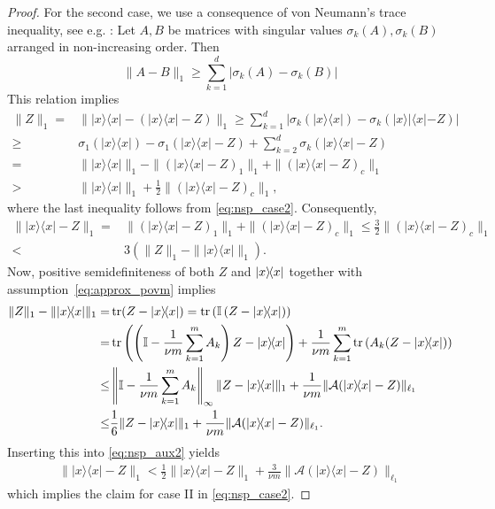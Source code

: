 \begin{proof}
For the second case, we use a consequence of von Neumann's trace inequality, see e.g. \cite[Theorem~7.4.9.1]{Horn_1994_Topics}: Let $A, B$ be matrices with singular values $\sigma_k (A),\sigma_k (B)$ arranged in non-increasing order.
Then
\begin{equation*}
  \| A - B \|_1 \geq \sum_{k=1}^d | \sigma_k (A) - \sigma_k (B)|
\end{equation*}
This relation implies
\begin{align*}
  \| Z \|_1 =& \| |{x} \rangle \! \langle {x}| - (|{x} \rangle \! \langle {x}|-Z) \|_1
  \geq \sum_{k=1}^d \left| \sigma_k (| x \rangle \! \langle  x|) - \sigma_k (| x \rangle \! |\langle  x|- Z ) \right| \\
  \geq & \sigma_1 (| x \rangle \langle  x|) - \sigma_1 \left( | x \rangle \! \langle  x| - Z \right)+ \sum_{k=2}^d \sigma_k \left( | x \rangle \! \langle  x| - Z\right) \\
  =&  \| | x \rangle \! \langle  x| \|_1  - \| (| x \rangle \! \langle  x| - Z)_1 \|_1 + \|(| x \rangle \! \langle  x| -Z)_c \|_1 \\
  >& \| | x \rangle \! \langle  x| \|_1 + \frac{1}{2} \| (| x \rangle \! \langle  x|-Z)_c \|_1,
\end{align*}
where the last inequality follows from \eqref{eq:nsp_case2}. Consequently,
\begin{align}
  \| | x \rangle \! \langle  x| - Z \|_1
  =& \| (| x \rangle \! \langle  x| - Z)_1 \|_1 + \| (| x \rangle \! \langle  x|-Z)_c \|_1
  \leq \frac{3}{2} \| (| x \rangle \! \langle  x|- Z )_c \|_1 \nonumber \\
  < & 3 \left( \| Z \|_1 - \| | x \rangle \! \langle  x| \|_1 \right). \label{eq:nsp_aux2}
\end{align}
Now, positive semidefiniteness of both $Z$ and $\ket{ x}\bra{ x}$ together with assumption~\eqref{eq:approx_povm} implies
\begin{align*}
  \| Z \|_1 - \| |{x} \rangle \! \langle {x}| \|_1
  =& \tr (Z-|{x} \rangle \! \langle {x}|) =  \tr \left( \mathbb{I} \left( Z-| {x} \rangle \! \langle x|\right) \right) \\
  =&  \tr \left( \left( \mathbb{I} - \frac{1}{\nu m} \sum_{k=1}^m A_k \right) Z-|{x} \rangle \! \langle {x}| \right) + \frac{1}{\nu m} \sum_{k=1}^m \tr \left( A_k (Z-|{x} \rangle \! \langle {x}|) \right) \\
  \leq &  \left\|\mathbb{I}- \frac{1}{ \nu m} \sum_{k=1}^m A_k \right\|_\infty \| Z-|{x} \rangle \! \langle {x}| \|_1 + \frac{1}{\nu m} \| \mathcal{A}(|{x} \rangle \! \langle {x}|-Z) \|_{\ell_1} \\
  \leq &  \frac{1}{6 } \| Z-|{x} \rangle \! \langle {x}| \|_1 + \frac{1}{\nu m} \| \mathcal{A}(|{x} \rangle \! \langle {x}|-Z) \|_{\ell_1}.
\end{align*}
Inserting this into \eqref{eq:nsp_aux2} yields
\begin{align*}
\| | x \rangle \! \langle  x| - Z \|_1 < \frac{1}{2} \| |{x} \rangle \! \langle {x}|-Z \|_1 +  \frac{3}{\nu m} \| \mathcal{A}(|{x} \rangle \! \langle {x}|-Z) \|_{\ell_1}
\end{align*}
which implies the claim for case II in \eqref{eq:nsp_case2}.
\end{proof}


